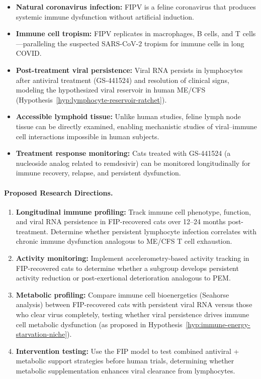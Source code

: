 \begin{itemize}
    \item \textbf{Natural coronavirus infection:} FIPV is a feline coronavirus that produces systemic immune dysfunction without artificial induction.
    \item \textbf{Immune cell tropism:} FIPV replicates in macrophages, B cells, and T cells---paralleling the suspected SARS-CoV-2 tropism for immune cells in long COVID.
    \item \textbf{Post-treatment viral persistence:} Viral RNA persists in lymphocytes after antiviral treatment (GS-441524) and resolution of clinical signs, modeling the hypothesized viral reservoir in human ME/CFS (Hypothesis~\ref{hyp:lymphocyte-reservoir-ratchet}).
    \item \textbf{Accessible lymphoid tissue:} Unlike human studies, feline lymph node tissue can be directly examined, enabling mechanistic studies of viral--immune cell interactions impossible in human subjects.
    \item \textbf{Treatment response monitoring:} Cats treated with GS-441524 (a nucleoside analog related to remdesivir) can be monitored longitudinally for immune recovery, relapse, and persistent dysfunction.
\end{itemize}

\paragraph{Proposed Research Directions.}
\begin{enumerate}
    \item \textbf{Longitudinal immune profiling:} Track immune cell phenotype, function, and viral RNA persistence in FIP-recovered cats over 12--24 months post-treatment. Determine whether persistent lymphocyte infection correlates with chronic immune dysfunction analogous to ME/CFS T cell exhaustion.
    \item \textbf{Activity monitoring:} Implement accelerometry-based activity tracking in FIP-recovered cats to determine whether a subgroup develops persistent activity reduction or post-exertional deterioration analogous to PEM.
    \item \textbf{Metabolic profiling:} Compare immune cell bioenergetics (Seahorse analysis) between FIP-recovered cats with persistent viral RNA versus those who clear virus completely, testing whether viral persistence drives immune cell metabolic dysfunction (as proposed in Hypothesis~\ref{hyp:immune-energy-starvation-niche}).
    \item \textbf{Intervention testing:} Use the FIP model to test combined antiviral + metabolic support strategies before human trials, determining whether metabolic supplementation enhances viral clearance from lymphocytes.
\end{enumerate}

